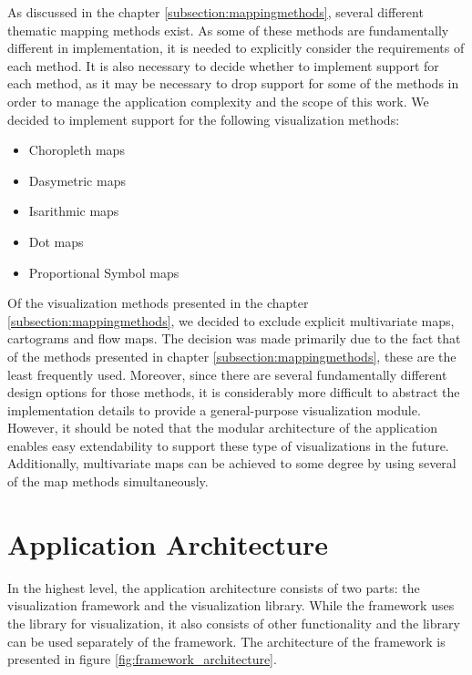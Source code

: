 As discussed in the chapter \ref{subsection:mappingmethods}, several different thematic mapping methods exist. As some of these methods are fundamentally different in implementation, it is needed to explicitly consider the requirements of each method. It is also necessary to decide whether to implement support for each method, as it may be necessary to drop support for some of the methods in order to manage the application complexity and the scope of this work. We decided to implement support for the following visualization methods:

\begin{itemize}
	\item Choropleth maps
	\item Dasymetric maps
	\item Isarithmic maps
	\item Dot maps
	\item Proportional Symbol maps
\end{itemize}


Of the visualization methods presented in the chapter \ref{subsection:mappingmethods}, we decided to exclude explicit multivariate maps, cartograms and flow maps. The decision was made primarily due to the fact that of the methods presented in chapter \ref{subsection:mappingmethods}, these are the least frequently used. Moreover, since there are several fundamentally different design options for those methods, it is considerably more difficult to abstract the implementation details to provide a general-purpose visualization module. However, it should be noted that the modular architecture of the application enables easy extendability to support these type of visualizations in the future. Additionally, multivariate maps can be achieved to some degree by using several of the map methods simultaneously.

\section{Application Architecture}

In the highest level, the application architecture consists of two parts: the visualization framework and the visualization library. While the framework uses the library for visualization, it also consists of other functionality and the library can be used separately of the framework. The architecture of the framework is presented in figure \ref{fig:framework_architecture}.

